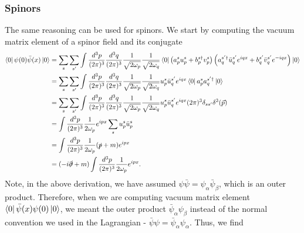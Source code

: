 \documentclass[11pt]{article}
\theoremstyle{definition}
\begin{document}
\subsubsection{Spinors}
The same reasoning can be used for spinors. We start by computing the vacuum matrix element of a spinor field and its conjugate
\begin{equation}
\begin{aligned}
        \bra{0}\psi(0)\bar{\psi}(x)\ket{0} &=  \sum_{s}\sum_{s'}\int\frac{d^{3}p}{(2\pi)^{3}}\frac{d^{3}q}{(2\pi)^{3}}\frac{1}{\sqrt{2\omega_{p}}}\frac{1}{\sqrt{2\omega_{q}}}\bra{0}\left(a_{p}^{s}u_{p}^{s}+ b_{p}^{s\dagger}v_{p}^{s}\right)\left(a_{q}^{s'\dagger}\bar{u}_{q}^{s'}e^{iqx}+b_{q}^{s'}\bar{v}_{q}^{s'}e^{-iqx}\right)\ket{0} \\
        &= \sum_{s}\sum_{s'}\int\frac{d^{3}p}{(2\pi)^{3}}\frac{d^{3}q}{(2\pi)^{3}}\frac{1}{\sqrt{2\omega_{p}}}\frac{1}{\sqrt{2\omega_{q}}}u_{p}^{s}\bar{u}_{q}^{s'}e^{iqx}\bra{0}a_{p}^{s}a_{q}^{s'\dagger}\ket{0} \\
        &= \sum_{s}\sum_{s'}\int\frac{d^{3}p}{(2\pi)^{3}}\frac{d^{3}q}{(2\pi)^{3}}\frac{1}{\sqrt{2\omega_{p}}}\frac{1}{\sqrt{2\omega_{q}}}u_{p}^{s}\bar{u}_{q}^{s'}e^{iqx}(2\pi)^3\delta_{ss'}\delta^3({\vec{p}}) \\
        &= \int\frac{d^{3}p}{(2\pi)^{3}}\frac{1}{2\omega_p}e^{ipx}\sum_{s}u_{p}^{s}\bar{u}_{p}^{s} \\
        &= \int\frac{d^{3}p}{(2\pi)^{3}}\frac{1}{2\omega_p}(\slashed{p}+m)e^{ipx} \\
        &= (-i\slashed{\partial}+m)\int\frac{d^{3}p}{(2\pi)^{3}}\frac{1}{2\omega_p}e^{ipx}.
\end{aligned}
\end{equation}
Note, in the above derivation, we have assumed $\psi\bar{\psi} = \psi_\alpha\bar{\psi}_\beta$, which is an outer product. Therefore, when we are computing vacuum matrix element $\bra{0}\bar{\psi}(x)\psi(0)\ket{0}$, we meant the outer product $\bar{\psi}_\alpha\psi_\beta$ instead of the normal convention we used in the Lagrangian - $\bar{\psi}\psi = \bar{\psi}_\alpha\psi_\alpha$. Thus, we find
\end{document}
